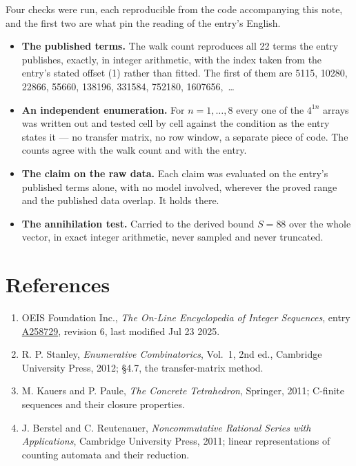 \documentclass[11pt]{article}
\theoremstyle{definition}
\begin{document}
Four checks were run, each reproducible from the code accompanying this note, and the first two are what pin the reading of the entry's English.

\begin{itemize}

\item {\bfseries The published terms.} The walk count reproduces all 22 terms the entry publishes, exactly, in integer arithmetic, with the index taken from the entry's stated offset (1) rather than fitted. The first of them are 5115, 10280, 22866, 55660, 138196, 331584, 752180, 1607656,~\dots

\item {\bfseries An independent enumeration.} For $n = 1,\dots,8$ every one of the $4^{1n}$ arrays was written out and tested cell by cell against the condition as the entry states it --- no transfer matrix, no row window, a separate piece of code. The counts agree with the walk count and with the entry.

\item {\bfseries The claim on the raw data.} Each claim was evaluated on the entry's published terms alone, with no model involved, wherever the proved range and the published data overlap. It holds there.

\item {\bfseries The annihilation test.} Carried to the derived bound $S = 88$ over the whole vector, in exact integer arithmetic, never sampled and never truncated.

\end{itemize}

\section{References}

\begin{enumerate}

\item OEIS Foundation Inc., \emph{The On-Line Encyclopedia of Integer Sequences}, entry \href{https://oeis.org/A258729}{A258729}, revision 6, last modified Jul 23 2025.

\item R. P. Stanley, \emph{Enumerative Combinatorics}, Vol.~1, 2nd ed., Cambridge University Press, 2012; \S4.7, the transfer-matrix method.

\item M. Kauers and P. Paule, \emph{The Concrete Tetrahedron}, Springer, 2011; C-finite sequences and their closure properties.

\item J. Berstel and C. Reutenauer, \emph{Noncommutative Rational Series with Applications}, Cambridge University Press, 2011; linear representations of counting automata and their reduction.

\end{enumerate}
\end{document}
